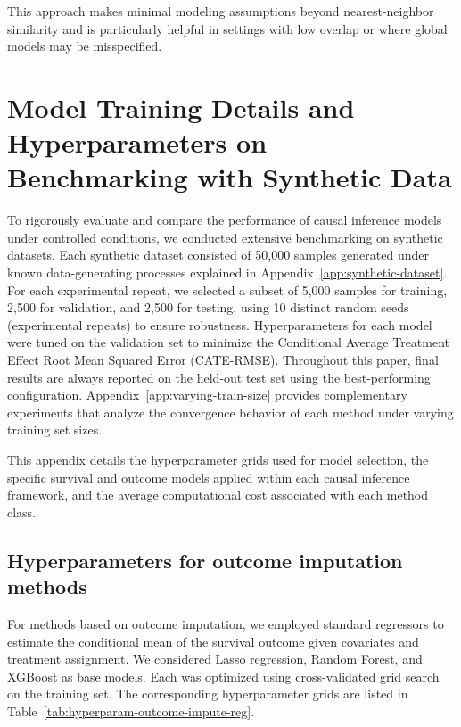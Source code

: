 \documentclass{article} %
\begin{document}
This approach makes minimal modeling assumptions beyond nearest-neighbor similarity and is particularly helpful in settings with low overlap or where global models may be misspecified.

\clearpage


\section{Model Training Details and Hyperparameters on Benchmarking with Synthetic Data}
\label{app:method_settings}

To rigorously evaluate and compare the performance of causal inference models under controlled conditions, we conducted extensive benchmarking on synthetic datasets. Each synthetic dataset consisted of 50,000 samples generated under known data-generating processes explained in Appendix~\ref{app:synthetic-dataset}. For each experimental repeat, we selected a subset of 5,000 samples for training, 2,500 for validation, and 2,500 for testing, using 10 distinct random seeds (experimental repeats) to ensure robustness. Hyperparameters for each model were tuned on the validation set to minimize the Conditional Average Treatment Effect Root Mean Squared Error (CATE-RMSE).
Throughout this paper, final results are always reported on the held-out test set using the best-performing configuration. Appendix~\ref{app:varying-train-size} provides complementary experiments that analyze the convergence behavior of each method under varying training set sizes.

This appendix details the hyperparameter grids used for model selection, the specific survival and outcome models applied within each causal inference framework, and the average computational cost associated with each method class.

\vspace{0.2cm}
\subsection{Hyperparameters for outcome imputation methods}

For methods based on outcome imputation, we employed standard regressors to estimate the conditional mean of the survival outcome given covariates and treatment assignment. We considered Lasso regression, Random Forest, and XGBoost as base models. Each was optimized using cross-validated grid search on the training set. The corresponding hyperparameter grids are listed in Table~\ref{tab:hyperparam-outcome-impute-reg}.
\end{document}
